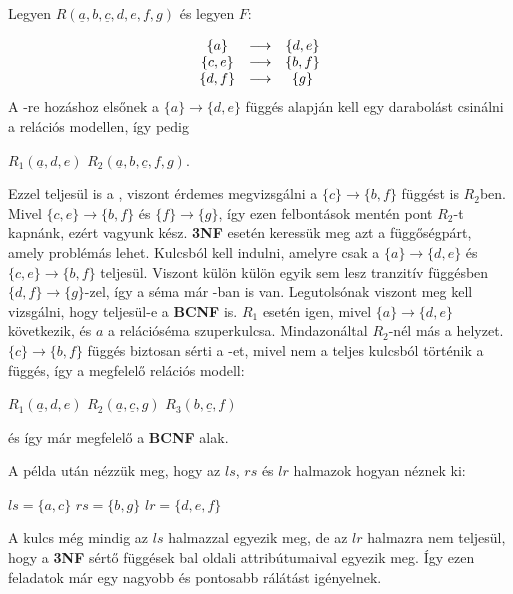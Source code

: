 \begin{pld}
Legyen $R(\underline{a},b,\underline{c},d,e,f,g)$ és legyen $F$:

    $$
    \begin{matrix}
        \{a\} & \longrightarrow & \{d,e\} \\
        \{c,e\} & \longrightarrow &\{b,f\} \\
        \{d,f\} & \longrightarrow & \{g\} \break
    \end{matrix}
    $$
A \nfk-re hozáshoz elsőnek a $\{a\} \longrightarrow \{d,e\}$ függés alapján kell egy darabolást csinálni a relációs modellen, így pedig
\begin{center}
    $R_1(\underline{a},d,e)$ \break
    $R_2(\underline{a},b,\underline{c},f,g).$ \break
\end{center}
Ezzel teljesül is a \nfk, viszont érdemes megvizsgálni a  $\{c\} \longrightarrow \{b,f\}$ függést is $R_2$ben. Mivel  $\{c,e\} \longrightarrow \{b,f\}$ és $\{f\} \longrightarrow \{g\}$, így ezen felbontások mentén pont $R_2$-t kapnánk, ezért vagyunk kész.
\textbf{3NF} esetén keressük meg azt a függőségpárt, amely problémás lehet. Kulcsból kell indulni, amelyre csak a $\{a\} \longrightarrow \{d,e\}$ és $\{c,e\} \longrightarrow \{b,f\}$  teljesül. Viszont külön külön egyik sem lesz tranzitív függésben $\{d,f\} \longrightarrow \{g\}$-zel, így a séma már \nfh-ban is van.
Legutolsónak viszont meg kell vizsgálni, hogy teljesül-e a \textbf{BCNF} is. $R_1$ esetén igen, mivel $\{a\} \longrightarrow \{d,e\}$ következik, és $a$ a relációséma szuperkulcsa. Mindazonáltal $R_2$-nél más a helyzet. 
$\{c\} \longrightarrow \{b,f\}$ függés biztosan sérti a \BCNF-et, mivel nem a teljes kulcsból történik a függés, így a megfelelő relációs modell:
\begin{center}
    $R_1(\underline{a},d,e)$ \break
    $R_2(\underline{a},\underline{c},g)$ \break
    $R_3(b,\underline{c},f)$
\end{center}
és így már megfelelő a \textbf{BCNF} alak.
\end{pld}

A példa után nézzük meg, hogy az $ls$, $rs$ és $lr$ halmazok hogyan néznek ki:
\begin{center}
    $ls = \{a, c\}$ \break
    $rs = \{b, g\}$ \break
    $lr = \{d, e, f\}$
\end{center}

A kulcs még mindig az $ls$ halmazzal egyezik meg, de az $lr$ halmazra nem teljesül, hogy a \textbf{3NF} sértő függések bal oldali attribútumaival egyezik meg. Így ezen feladatok már egy nagyobb és pontosabb rálátást igényelnek.

